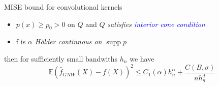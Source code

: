 \documentclass[final,dvipsnames]{beamer}
\newcommand{\myemph}[1]{\textcolor{blue}{#1}}
\DeclareMathOperator\supp{supp}
\begin{document}
\begin{frame}
\begin{columns}[T]
\begin{column}{0.48\textwidth}
\begin{block}{MISE bound for convolutional kernels}
\begin{itemize}
        \small \item $p(x)\geq p_0>0$ on $Q$ and $Q$ \textit{satisfies \myemph{interior cone condition}}
        \small \item f is \textit{$\alpha$ Hölder continnous on $\supp{p}$}
        \vspace{10pt}
            \end{itemize}
            \small then for sufficiently small bandwiths $h_n$ we have
            \begin{equation*}
                \mathbb{E}(\hat{f}_{GNW}(X)-f(X))^2\leq C_1(\alpha)h_n^{\alpha}+\frac{C(B,\sigma)}{nh_n^d}
            \end{equation*}
    \end{block}


\end{column}
\end{columns}
\end{frame}
\end{document}
